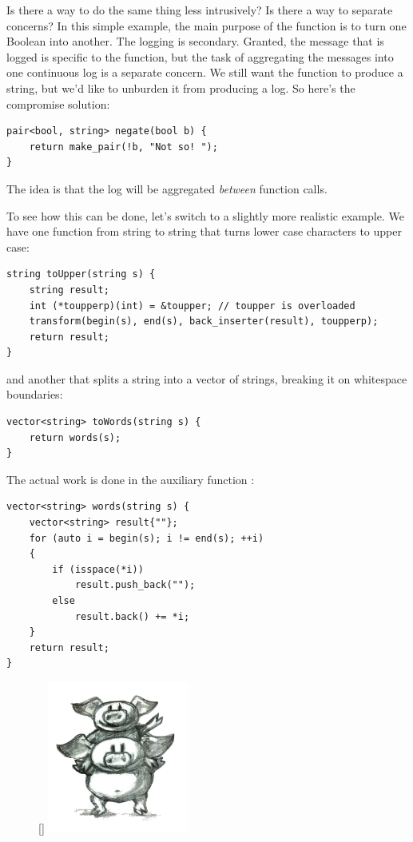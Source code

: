 Is there a way to do the same thing less intrusively? Is there a way to
separate concerns? In this simple example, the main purpose of the
function  is to turn one Boolean into another. The
logging is secondary. Granted, the message that is logged is specific to
the function, but the task of aggregating the messages into one
continuous log is a separate concern. We still want the function to
produce a string, but we'd like to unburden it from producing a log. So
here's the compromise solution:

\begin{Verbatim}
pair<bool, string> negate(bool b) {
    return make_pair(!b, "Not so! ");
}
\end{Verbatim}
The idea is that the log will be aggregated \emph{between} function
calls.

To see how this can be done, let's switch to a slightly more realistic
example. We have one function from string to string that turns lower
case characters to upper case:

\begin{Verbatim}
string toUpper(string s) {
    string result;
    int (*toupperp)(int) = &toupper; // toupper is overloaded
    transform(begin(s), end(s), back_inserter(result), toupperp);
    return result;
}
\end{Verbatim}
and another that splits a string into a vector of strings, breaking it
on whitespace boundaries:

\begin{Verbatim}
vector<string> toWords(string s) {
    return words(s);
}
\end{Verbatim}
The actual work is done in the auxiliary function :

\begin{Verbatim}
vector<string> words(string s) {
    vector<string> result{""};
    for (auto i = begin(s); i != end(s); ++i)
    {
        if (isspace(*i))
            result.push_back(""); 
        else
            result.back() += *i;
    }
    return result;
}
\end{Verbatim}

\begin{figure}
\raisebox{0pt}[\dimexpr{}\baselineskip\relax]{
\includegraphics[width=1.83333in]{images/piggyback.jpg}}%
\end{figure}

